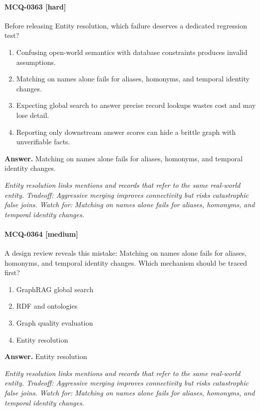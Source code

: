\paragraph{MCQ-0363 [hard]} Before releasing Entity resolution, which failure deserves a dedicated regression test?
\begin{enumerate}[label=\Alph*.]
\item Confusing open-world semantics with database constraints produces invalid assumptions.
\item Matching on names alone fails for aliases, homonyms, and temporal identity changes.
\item Expecting global search to answer precise record lookups wastes cost and may lose detail.
\item Reporting only downstream answer scores can hide a brittle graph with unverifiable facts.
\end{enumerate}
\noindent\textbf{Answer.} Matching on names alone fails for aliases, homonyms, and temporal identity changes.
\par\textit{Entity resolution links mentions and records that refer to the same real-world entity. Tradeoff: Aggressive merging improves connectivity but risks catastrophic false joins. Watch for: Matching on names alone fails for aliases, homonyms, and temporal identity changes.}
\paragraph{MCQ-0364 [medium]} A design review reveals this mistake: Matching on names alone fails for aliases, homonyms, and temporal identity changes. Which mechanism should be traced first?
\begin{enumerate}[label=\Alph*.]
\item GraphRAG global search
\item RDF and ontologies
\item Graph quality evaluation
\item Entity resolution
\end{enumerate}
\noindent\textbf{Answer.} Entity resolution
\par\textit{Entity resolution links mentions and records that refer to the same real-world entity. Tradeoff: Aggressive merging improves connectivity but risks catastrophic false joins. Watch for: Matching on names alone fails for aliases, homonyms, and temporal identity changes.}
